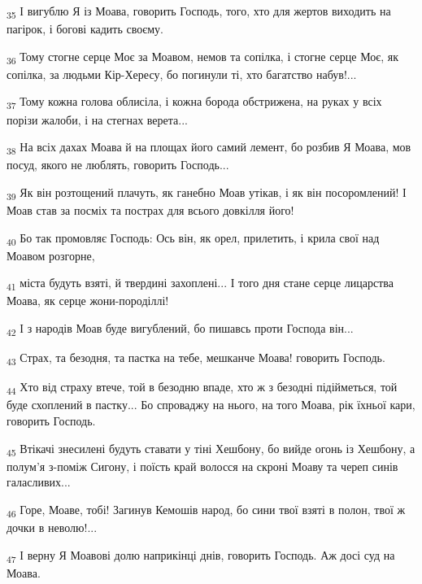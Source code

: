 \begin{tcolorbox}
\textsubscript{35} І вигублю Я із Моава, говорить Господь, того, хто для жертов виходить на пагірок, і богові кадить своєму.
\end{tcolorbox}
\begin{tcolorbox}
\textsubscript{36} Тому стогне серце Моє за Моавом, немов та сопілка, і стогне серце Моє, як сопілка, за людьми Кір-Хересу, бо погинули ті, хто багатство набув!...
\end{tcolorbox}
\begin{tcolorbox}
\textsubscript{37} Тому кожна голова облисіла, і кожна борода обстрижена, на руках у всіх порізи жалоби, і на стегнах верета...
\end{tcolorbox}
\begin{tcolorbox}
\textsubscript{38} На всіх дахах Моава й на площах його самий лемент, бо розбив Я Моава, мов посуд, якого не люблять, говорить Господь...
\end{tcolorbox}
\begin{tcolorbox}
\textsubscript{39} Як він розтощений плачуть, як ганебно Моав утікав, і як він посоромлений! І Моав став за посміх та пострах для всього довкілля його!
\end{tcolorbox}
\begin{tcolorbox}
\textsubscript{40} Бо так промовляє Господь: Ось він, як орел, прилетить, і крила свої над Моавом розгорне,
\end{tcolorbox}
\begin{tcolorbox}
\textsubscript{41} міста будуть взяті, й твердині захоплені... І того дня стане серце лицарства Моава, як серце жони-породіллі!
\end{tcolorbox}
\begin{tcolorbox}
\textsubscript{42} І з народів Моав буде вигублений, бо пишавсь проти Господа він...
\end{tcolorbox}
\begin{tcolorbox}
\textsubscript{43} Страх, та безодня, та пастка на тебе, мешканче Моава! говорить Господь.
\end{tcolorbox}
\begin{tcolorbox}
\textsubscript{44} Хто від страху втече, той в безодню впаде, хто ж з безодні підійметься, той буде схоплений в пастку... Бо спроваджу на нього, на того Моава, рік їхньої кари, говорить Господь.
\end{tcolorbox}
\begin{tcolorbox}
\textsubscript{45} Втікачі знесилені будуть ставати у тіні Хешбону, бо вийде огонь із Хешбону, а полум'я з-поміж Сигону, і поїсть край волосся на скроні Моаву та череп синів галасливих...
\end{tcolorbox}
\begin{tcolorbox}
\textsubscript{46} Горе, Моаве, тобі! Загинув Кемошів народ, бо сини твої взяті в полон, твої ж дочки в неволю!...
\end{tcolorbox}
\begin{tcolorbox}
\textsubscript{47} І верну Я Моавові долю наприкінці днів, говорить Господь. Аж досі суд на Моава.
\end{tcolorbox}
